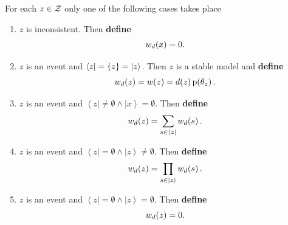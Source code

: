 \documentclass{beamer}
\newcommand{\at}[1]{\ensuremath{\!\del{#1}}}
\newcommand{\fml}[1]{\ensuremath{{\cal #1}}}
\newcommand{\uset}[1]{\ensuremath{\left|{#1}\right>}}
\newcommand{\lset}[1]{\ensuremath{\left<{#1}\right|}}
\newcommand{\pr}[1]{\ensuremath{\mathrm{p}\at{#1}}}
\begin{document}
\begin{frame}
    For each $z\in\fml{Z}$ only one of the following cases takes place 
    \begin{enumerate}
        \item $z$ is inconsistent. Then \textbf{define}
        \begin{equation}
            w_d\at{x} = 0.\label{def:w.inconsistent}
        \end{equation}
        \item $z$ is an event and $\lset{z} = \set{z} = \uset{z}$. Then $z$ is a stable model and \textbf{define}
        \begin{equation}
            w_d\at{z} = w\at{z} = d\at{z} \pr{\theta_z}.\label{eq:prob.sm}
        \end{equation}
        \item $z$ is an event and $\lset{z} \neq \emptyset \land \uset{x} = \emptyset$. Then \textbf{define} 
        \begin{equation}
            w_d\at{z} = \sum_{s \in \lset{z}} w_d\at{s}.\label{def:w.disj}
        \end{equation}
        \item $z$ is an event and $\lset{z} = \emptyset \land \uset{z} \neq \emptyset$. Then \textbf{define} 
        \begin{equation}
            w_d\at{z} = \prod_{s \in \uset{z}} w_d\at{s}.\label{def:w.conj}
        \end{equation}
        \item $z$ is an event and $\lset{z} = \emptyset \land \uset{z} = \emptyset$. Then \textbf{define} 
        \begin{equation}
            w_d\at{z} = 0.\label{def:w.empty}
        \end{equation}
    \end{enumerate}
    \end{frame}
\end{document}
